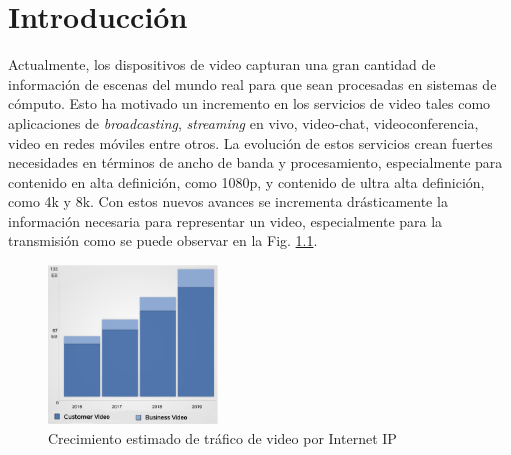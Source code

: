 \chapter{Introducci\'on}

Actualmente, los dispositivos de video capturan una gran cantidad de informaci\'on de escenas del mundo real para que sean procesadas en sistemas de c\'omputo. Esto ha motivado un incremento en los servicios de video tales como aplicaciones de \textit{broadcasting}, \textit{streaming} en vivo, video-chat, videoconferencia, video en redes m\'oviles entre otros. La evoluci\'on de estos servicios crean fuertes necesidades en t\'erminos de ancho de banda y procesamiento, especialmente para contenido en alta definici\'on, como 1080p, y contenido de ultra alta definici\'on, como 4k y 8k. Con estos nuevos avances se incrementa dr\'asticamente la informaci\'on necesaria para representar un video, especialmente para la transmisi\'on como se puede observar en la Fig. \ref{fig:vni}.

\begin{figure}[!h]
\centering
\includegraphics[width=0.4\textwidth]{images/vni.eps}
\caption[Crecimiento estimado de tr\'afico de video por Internet IP]{Crecimiento estimado de tr\'afico de video por Internet IP \cite{cisco_vni}} 
\label{fig:vni}
\end{figure}

